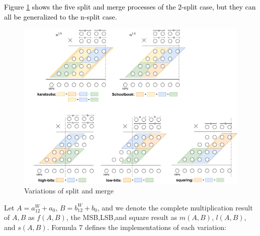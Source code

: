 \documentclass[conference]{IEEEtran}
\begin{document}
\textcolor{black}{
Figure \ref{Figure4} shows the five split and merge processes of the 2-split case, but they can all be generalized to the n-split case.
}


\begin{figure}[htbp]   %
	\centering
	\includegraphics[width=\linewidth,scale=1.00]{fig4.pdf}    %
	\caption{Variations of split and merge}
	\label{Figure4}
\end{figure}


Let $A=a_12^W+a_0$, $B=b_12^W+b_0$, and we denote the complete multiplication result of $A,B$ as $f(A,B)$, the MSB,LSB,and square result as $m(A,B)$, $l(A,B)$, and $s(A,B)$. Formula 7 defines the implementations of each variation: 
\end{document}

